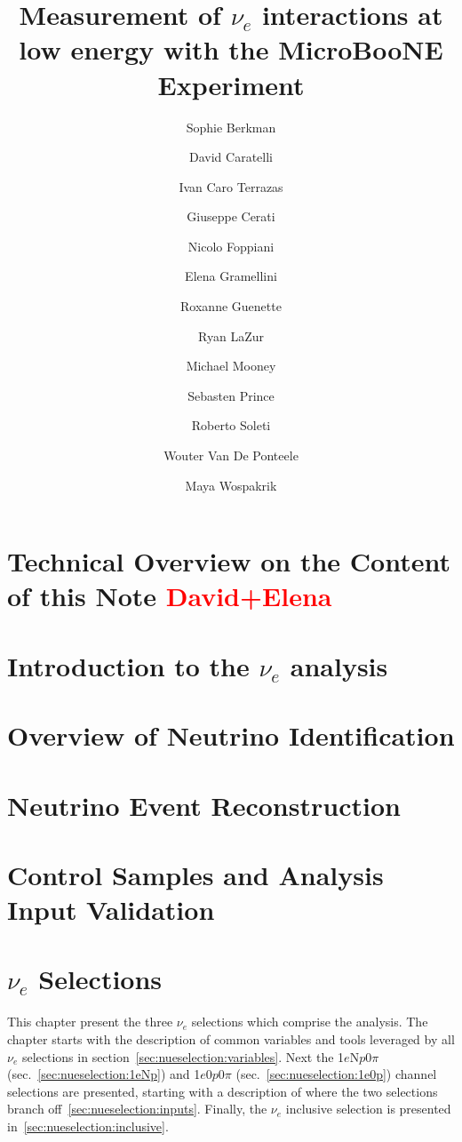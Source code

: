 \documentclass[a4paper]{article}
\title{Measurement of $\nu_e$ interactions at low energy with the MicroBooNE Experiment}
\author[1]{Sophie Berkman}
\author[1]{David Caratelli}
\author[2]{Ivan Caro Terrazas}
\author[1]{Giuseppe Cerati}
\author[3]{Nicolo Foppiani}
\author[1]{Elena Gramellini}
\author[3]{Roxanne Guenette}
\author[2]{Ryan LaZur}
\author[2]{Michael Mooney}
\author[3]{Sebasten Prince}
\author[3,4]{Roberto Soleti}
\author[3,4]{Wouter Van De Ponteele}
\author[1]{Maya Wospakrik}
\affil[1]{Fermi National Accelerator Laboratory}
\affil[2]{Colorado State University}
\affil[3]{Harvard University}
\affil[4]{University of Oxford}
\newcommand{\npsel}{1$e$N$p$0$\pi$ }
\newcommand{\zpsel}{1$e$0$p$0$\pi$ }
\begin{document}
\maketitle


\tableofcontents

\newpage
\section{Technical Overview on the Content of this Note \textcolor{red}{David+Elena}}

\newpage

\section{Introduction to the $\nu_e$ analysis}

\newpage

\section{Overview of Neutrino Identification}
\label{sec:sliceID}

\newpage

\section{Neutrino Event Reconstruction}
\label{sec:NuEvtReco}

\newpage

\section{Control Samples and Analysis Input Validation}
\label{sec:controls}

\newpage


\section{$\nu_e$ Selections}
\label{sec:nueselection}
\par This chapter present the three $\nu_e$ selections which comprise the analysis. The chapter starts with the description of common variables and tools leveraged by all $\nu_e$ selections in section~\ref{sec:nueselection:variables}. Next the \npsel (sec.~\ref{sec:nueselection:1eNp}) and \zpsel (sec.~\ref{sec:nueselection:1e0p}) channel selections are presented, starting with a description of where the two selections branch off~\ref{sec:nueselection:inputs}. Finally, the $\nu_e$ inclusive selection is presented in~\ref{sec:nueselection:inclusive}.
\end{document}

